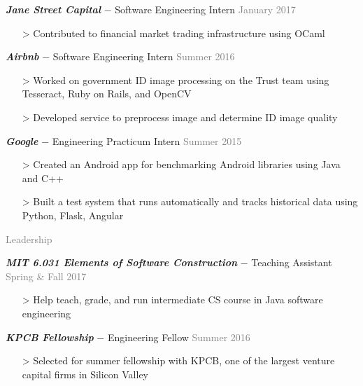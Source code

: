 \documentclass[11pt]{article}
\newcommand{\rsection}[1]{\vspace{1.5em}\textcolor{gray}{\Large \robotoslab #1}\vspace{0.5em}}
\newcommand{\bt}[1]{\textit{\textbf{#1}}} %
\newcommand{\gap}[0]{\vspace{0.4em}} %
\newcommand{\dash}[0]{ $-$ } %
\newcommand{\gray}[1]{\textcolor{gray}{#1}}
\newcommand{\e}[0]{> }
\begin{document}
\gap

\bt{Jane Street Capital}\dash Software Engineering Intern \hfill \gray{January 2017}

\begin{itemize}
\item[\e] Contributed to financial market trading infrastructure using OCaml
\end{itemize}

\gap

\bt{Airbnb}\dash Software Engineering Intern \hfill \gray{Summer 2016}

\begin{itemize}
\item[\e] Worked on government ID image processing on the Trust team using Tesseract, Ruby on Rails, and OpenCV
\item[\e] Developed service to preprocess image and determine ID image quality
\end{itemize}

\gap

\bt{Google}\dash Engineering Practicum Intern \hfill \gray{Summer 2015}

\begin{itemize}
\item[\e] Created an Android app for benchmarking Android libraries using Java and C++
\item[\e] Built a test system that runs automatically and tracks historical data using Python, Flask, Angular
\end{itemize}

\rsection{Leadership}

\bt{MIT 6.031 Elements of Software Construction}\dash Teaching Assistant \hfill \gray{Spring \& Fall 2017}

\begin{itemize}
\item[\e] Help teach, grade, and run intermediate CS course in Java software engineering
\end{itemize}

\gap

\bt{KPCB Fellowship}\dash Engineering Fellow \hfill \gray{Summer 2016}

\begin{itemize}
\item[\e] Selected for summer fellowship with KPCB, one of the largest venture capital firms in Silicon Valley
\end{itemize}

\gap
\end{document}
